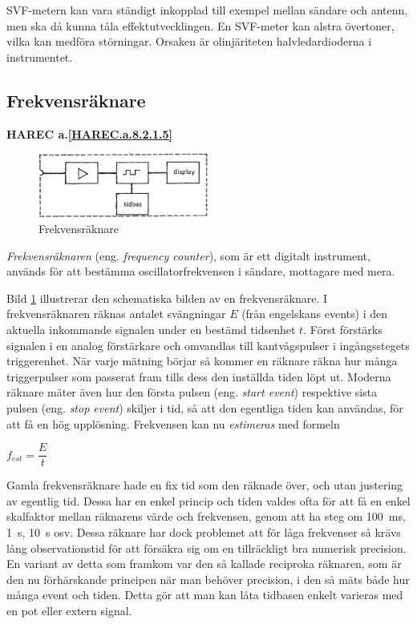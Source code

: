 SVF-metern kan vara ständigt inkopplad till exempel mellan sändare och antenn, men
ska då kunna tåla effektutvecklingen.
En SVF-meter kan alstra övertoner, vilka kan medföra störningar.
Orsaken är olinjäriteten halvledardioderna i instrumentet.

\subsection{Frekvensräknare}
\textbf{
HAREC a.\ref{HAREC.a.8.2.1.5}\label{myHAREC.a.8.2.1.5}
}

\begin{figure}
  \includegraphics[width=0.5\textwidth]{images/cropped_pdfs/bild_2_8-10.pdf}
  \caption{Frekvensräknare}
  \label{fig:bildII8-10}
\end{figure}

\emph{Frekvensräknaren} (eng. \emph{frequency counter}), som är ett digitalt
instrument, används för att bestämma oscillatorfrekvensen i sändare,
mottagare med mera.

Bild \ref{fig:bildII8-10} illustrerar den schematiska bilden av en
frekvensräknare.
I frekvensräknaren räknas antalet svängningar \(E\) (från engelskans events)
i den aktuella inkommande signalen under en bestämd tidsenhet \(t\).
Först förstärks signalen i en analog förstärkare och omvandlas till
kantvågspulser i ingångsstegets triggerenhet.
När varje mätning börjar så kommer en räknare räkna hur många triggerpulser
som passerat fram tills dess den inställda tiden löpt ut.
Moderna räknare mäter även hur den första pulsen (eng. \emph{start event})
respektive sista pulsen (eng. \emph{stop event}) skiljer i tid, så att den
egentliga tiden kan användas, för att få en hög upplösning.
Frekvensen kan nu \emph{estimeras} med formeln

\(f_{est} = \dfrac{E}{t}\)

Gamla frekvensräknare hade en fix tid som den räknade över, och utan justering
av egentlig tid.
Dessa har en enkel princip och tiden valdes ofta för att få en enkel skalfaktor
mellan räknarens värde och frekvensen, genom att ha steg om 100~ms, 1~s, 10~s
osv.
Dessa räknare har dock problemet att för låga frekvenser så krävs lång
observationstid för att försäkra sig om en tillräckligt bra numerisk precision.
En variant av detta som framkom var den så kallade reciproka räknaren, som är
den nu förhärskande principen när man behöver precision, i den så mäts både
hur många event och tiden.
Detta gör att man kan låta tidbasen enkelt varieras med en pot eller extern
signal.

